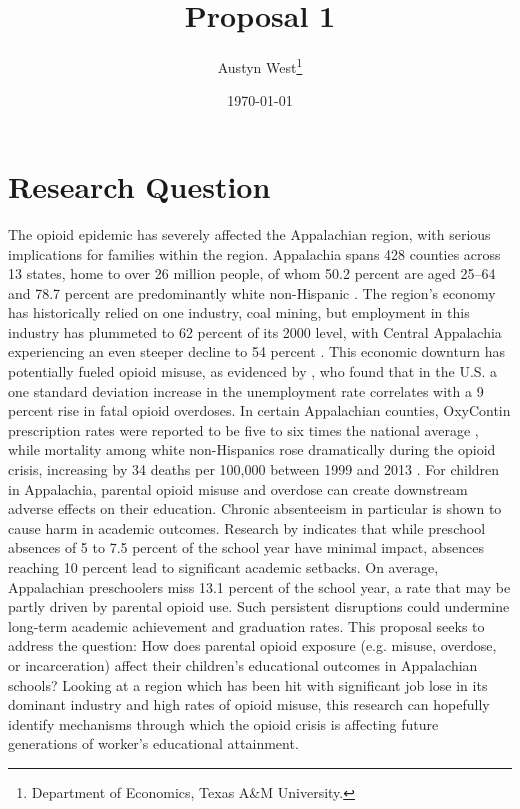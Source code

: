 
\title{Proposal 1}
\author{Austyn West\thanks{Department of Economics, Texas A\&M University.} }
\date{\today}


\maketitle

\section*{Research Question}
The opioid epidemic has severely affected the Appalachian region, with serious implications for families within the region. Appalachia spans 428 counties across 13 states, home to over 26 million people, of whom 50.2 percent are aged 25–64 and 78.7 percent are predominantly white non-Hispanic \citep{srygleyAPPALACHIANREGIONDATA}. The region’s economy has historically relied on one industry, coal mining, but employment in this industry has plummeted to 62 percent of its 2000 level, with Central Appalachia experiencing an even steeper decline to 54 percent \citep{CoalProductionEmployment}. This economic downturn has potentially fueled opioid misuse, as evidenced by \citet{hollingsworthMacroeconomicConditionsOpioid2017}, who found that in the U.S. a one standard deviation increase in the unemployment rate correlates with a 9 percent rise in fatal opioid overdoses. In certain Appalachian counties, OxyContin prescription rates were reported to be five to six times the national average \citep{moodySubstanceUseRural2017}, while mortality among white non-Hispanics rose dramatically during the opioid crisis, increasing by 34 deaths per 100,000 between 1999 and 2013 \citep{caseRisingMorbidityMortality2015}. For children in Appalachia, parental opioid misuse and overdose can create downstream adverse effects on their education. Chronic absenteeism in particular is shown to cause harm in academic outcomes. Research by \citet{rhoad-drogalisAbsenteeismAppalachianPreschool2018} indicates that while preschool absences of 5 to 7.5 percent of the school year have minimal impact, absences reaching 10 percent lead to significant academic setbacks. On average, Appalachian preschoolers miss 13.1 percent of the school year, a rate that may be partly driven by parental opioid use. Such persistent disruptions could undermine long-term academic achievement and graduation rates. This proposal seeks to address the question: How does parental opioid exposure (e.g. misuse, overdose, or incarceration) affect their children's educational outcomes in Appalachian schools? Looking at a region which has been hit with significant job lose in its dominant industry and high rates of opioid misuse, this research can hopefully identify mechanisms through which the opioid crisis is affecting future generations of worker's educational attainment.

